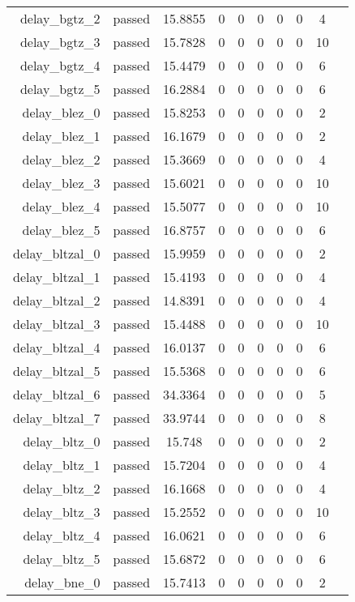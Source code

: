 \begin{longtable}{r|ccccccccc}
    delay\_bgtz\_2 & passed & 15.8855 & 0 & 0 & 0 & 0 & 0 & 4 \\
    delay\_bgtz\_3 & passed & 15.7828 & 0 & 0 & 0 & 0 & 0 & 10 \\
    delay\_bgtz\_4 & passed & 15.4479 & 0 & 0 & 0 & 0 & 0 & 6 \\
    delay\_bgtz\_5 & passed & 16.2884 & 0 & 0 & 0 & 0 & 0 & 6 \\
    delay\_blez\_0 & passed & 15.8253 & 0 & 0 & 0 & 0 & 0 & 2 \\
    delay\_blez\_1 & passed & 16.1679 & 0 & 0 & 0 & 0 & 0 & 2 \\
    delay\_blez\_2 & passed & 15.3669 & 0 & 0 & 0 & 0 & 0 & 4 \\
    delay\_blez\_3 & passed & 15.6021 & 0 & 0 & 0 & 0 & 0 & 10 \\
    delay\_blez\_4 & passed & 15.5077 & 0 & 0 & 0 & 0 & 0 & 10 \\
    delay\_blez\_5 & passed & 16.8757 & 0 & 0 & 0 & 0 & 0 & 6 \\
    delay\_bltzal\_0 & passed & 15.9959 & 0 & 0 & 0 & 0 & 0 & 2 \\
    delay\_bltzal\_1 & passed & 15.4193 & 0 & 0 & 0 & 0 & 0 & 4 \\
    delay\_bltzal\_2 & passed & 14.8391 & 0 & 0 & 0 & 0 & 0 & 4 \\
    delay\_bltzal\_3 & passed & 15.4488 & 0 & 0 & 0 & 0 & 0 & 10 \\
    delay\_bltzal\_4 & passed & 16.0137 & 0 & 0 & 0 & 0 & 0 & 6 \\
    delay\_bltzal\_5 & passed & 15.5368 & 0 & 0 & 0 & 0 & 0 & 6 \\
    delay\_bltzal\_6 & passed & 34.3364 & 0 & 0 & 0 & 0 & 0 & 5 \\
    delay\_bltzal\_7 & passed & 33.9744 & 0 & 0 & 0 & 0 & 0 & 8 \\
    delay\_bltz\_0 & passed & 15.748 & 0 & 0 & 0 & 0 & 0 & 2 \\
    delay\_bltz\_1 & passed & 15.7204 & 0 & 0 & 0 & 0 & 0 & 4 \\
    delay\_bltz\_2 & passed & 16.1668 & 0 & 0 & 0 & 0 & 0 & 4 \\
    delay\_bltz\_3 & passed & 15.2552 & 0 & 0 & 0 & 0 & 0 & 10 \\
    delay\_bltz\_4 & passed & 16.0621 & 0 & 0 & 0 & 0 & 0 & 6 \\
    delay\_bltz\_5 & passed & 15.6872 & 0 & 0 & 0 & 0 & 0 & 6 \\
    delay\_bne\_0 & passed & 15.7413 & 0 & 0 & 0 & 0 & 0 & 2 \\

\end{longtable}
